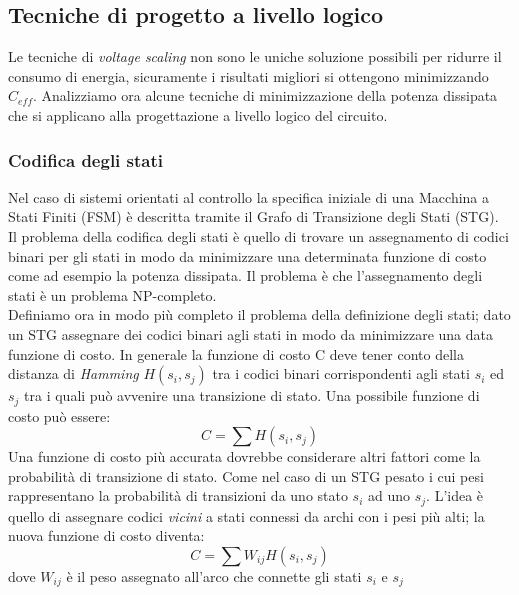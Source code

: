 \subsection{Tecniche di progetto a livello logico}
Le tecniche di \emph{voltage scaling} non sono le uniche soluzione possibili per ridurre il consumo di energia, sicuramente i risultati migliori si ottengono minimizzando $C_{eff}$.
Analizziamo ora alcune tecniche di minimizzazione della potenza dissipata che si applicano alla progettazione a livello logico del circuito.
\subsubsection{Codifica degli stati}
Nel caso di sistemi orientati al controllo la specifica iniziale di una Macchina a Stati Finiti (FSM) è descritta tramite il Grafo di Transizione degli Stati (STG).
Il problema della codifica degli stati è quello di trovare un assegnamento di codici binari per gli stati in modo da minimizzare una determinata funzione di costo come ad esempio la potenza dissipata. Il problema è che l'assegnamento degli stati è un problema NP-completo.\\
Definiamo ora in modo più completo il problema della definizione degli stati; dato un STG assegnare dei codici binari agli stati in modo da minimizzare una data funzione di costo. In generale la funzione di costo C deve tener conto della distanza di \emph{Hamming} $H(s_i,s_j)$ tra i codici binari corrispondenti agli stati $s_i$ ed $s_j$ tra i quali può avvenire una transizione di stato. Una possibile funzione di costo può essere:
$$C=\sum H(s_i,s_j)$$
Una funzione di costo più accurata dovrebbe considerare altri fattori come la probabilità di transizione di stato. Come nel caso di un STG pesato i cui pesi rappresentano la probabilità di transizioni da uno stato $s_i$ ad uno $s_j$. L'idea è quello di assegnare codici \emph{vicini} a stati connessi da archi con i pesi più alti; la nuova funzione di costo diventa:
$$C = \sum W_{ij} H(s_i,s_j)$$
dove $W_{ij}$ è il peso assegnato all'arco che connette gli stati $s_i$ e $s_j$
